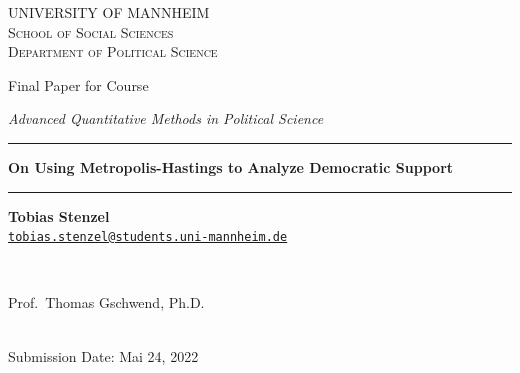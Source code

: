 \documentclass[12pt,english,a4paper,oneside]{article}
\theoremstyle{definition}
\theoremstyle{definition}
\theoremstyle{definition}
\theoremstyle{definition}
\theoremstyle{remark}
\begin{document}
\begin{titlepage}

    \begin{center}
    \large{ \textsc{ \uppercase{University of Mannheim} \\ \vspace{-0.2cm}
School of Social Sciences \\ \vspace{-0.2cm}
Department of Political Science}}

      
        \vspace{3.5cm}
        

       \large{   Final Paper for Course   }


       \large{ \textit{   Advanced Quantitative Methods in Political Science   }}

\renewcommand{\linethickness}{0.03em}
\rule{\linewidth}{\linethickness}


       \LARGE{ \textbf{   On Using Metropolis-Hastings to Analyze Democratic Support   }}


       \large{  }

        \vspace{-0.2cm}
\rule{\linewidth}{\linethickness}


\begin{minipage}[t]{0.5\textwidth}
\begin{flushleft}
\singlespacing
 \textbf{Tobias Stenzel}  \\ 


 \href{mailto:tobias.stenzel@students.uni-mannheim.de}{\nolinkurl{tobias.stenzel@students.uni-mannheim.de}}  \\ 

\end{flushleft}
\end{minipage}
\begin{minipage}[t]{0.4\textwidth}
\hfill
\end{minipage}\\
\vspace{0.2cm}
\begin{minipage}[t]{0.35\textwidth}
\hfill
\end{minipage}
\begin{minipage}[t]{0.55\textwidth}
\begin{flushright}
\singlespacing
     Prof.~Thomas Gschwend, Ph.D.  \\       

\end{flushright}
\end{minipage}\\
%


         \vfill
         Submission Date: Mai 24, 2022 \\ 
        





         \vfill



     \end{center}
    \thispagestyle{empty}
\end{titlepage}
\end{document}
